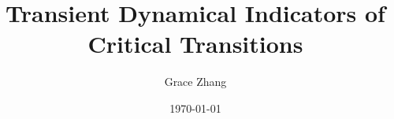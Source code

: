 \documentclass[]{article}
\title{Transient Dynamical Indicators of Critical Transitions}
\author{Grace Zhang}
\date{\today}
\theoremstyle{plain}
\theoremstyle{definition}
\begin{document}
	\maketitle
	
	\begin{abstract}
		
	\end{abstract}

	\tableofcontents
	
	
    \newpage	
    
    
    
    
    
    
    
    
    
   
    
    \newpage
	

	
\end{document}
